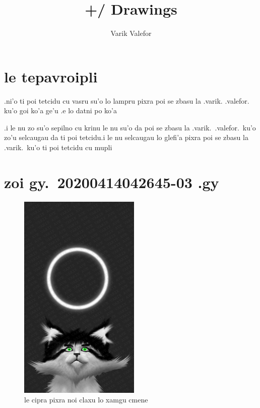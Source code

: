 \documentclass{report}
\title{+/ Drawings}
\author{Varik Valefor}
\newcommand\imageheight{10cm}
\begin{document}
\maketitle{}
\tableofcontents{}
\chapter{le tepavroipli}
.ni'o ti poi tetcidu cu vasru su'o lo lampru pixra poi se zbasu la .varik. .valefor. ku'o goi ko'a ge'u .e lo datni po ko'a

.i le nu zo su'o sepilno cu krinu le nu su'o da poi se zbasu la .varik.\ .valefor.\ ku'o zo'u selcaugau da ti poi tetcidu\@  .i le nu selcaugau lo glefi'a pixra poi se zbasu la .varik.\ ku'o ti poi tetcidu cu mupli
\chapter{zoi gy.\ 20200414042645-03 .gy}
\begin{figure}[ht]
	\centering
	\includegraphics[height=\imageheight]{20200414042645-03/20200414042645-03.jpg}
	\caption[center]{le cipra pixra noi claxu lo xamgu cmene}
\end{figure}
\end{document}
